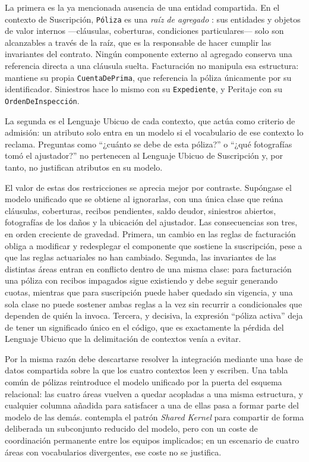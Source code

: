 La primera es la ya mencionada ausencia de una entidad compartida. En el contexto de Suscripción,
\texttt{Póliza} es una \emph{raíz de agregado} \parencite{evans2003}: sus entidades y objetos de
valor internos ---cláusulas, coberturas, condiciones particulares--- solo son alcanzables a través
de la raíz, que es la responsable de hacer cumplir las invariantes del contrato. Ningún componente
externo al agregado conserva una referencia directa a una cláusula suelta. Facturación no manipula
esa estructura: mantiene su propia \texttt{CuentaDePrima}, que referencia la póliza únicamente por
su identificador. Siniestros hace lo mismo con su \texttt{Expediente}, y Peritaje con su
\texttt{OrdenDeInspección}.

La segunda es el Lenguaje Ubicuo de cada contexto, que actúa como criterio de admisión: un atributo
solo entra en un modelo si el vocabulario de ese contexto lo reclama. Preguntas como
\enquote{¿cuánto se debe de esta póliza?} o \enquote{¿qué fotografías tomó el ajustador?} no
pertenecen al Lenguaje Ubicuo de Suscripción y, por tanto, no justifican atributos en su modelo.

El valor de estas dos restricciones se aprecia mejor por contraste. Supóngase el modelo unificado que
se obtiene al ignorarlas, con una única clase que reúna cláusulas, coberturas, recibos pendientes,
saldo deudor, siniestros abiertos, fotografías de los daños y la ubicación del ajustador. Las
consecuencias son tres, en orden creciente de gravedad. Primera, un cambio en las reglas de
facturación obliga a modificar y redesplegar el componente que sostiene la suscripción, pese a que
las reglas actuariales no han cambiado. Segunda, las invariantes de las distintas áreas entran en
conflicto dentro de una misma clase: para facturación una póliza con recibos impagados sigue
existiendo y debe seguir generando cuotas, mientras que para suscripción puede haber quedado sin
vigencia, y una sola clase no puede sostener ambas reglas a la vez sin recurrir a condicionales que
dependen de quién la invoca. Tercera, y decisiva, la expresión \enquote{póliza activa} deja de tener
un significado único en el código, que es exactamente la pérdida del Lenguaje Ubicuo que la
delimitación de contextos venía a evitar.

Por la misma razón debe descartarse resolver la integración mediante una base de datos compartida
sobre la que los cuatro contextos leen y escriben. Una tabla común de pólizas reintroduce el modelo
unificado por la puerta del esquema relacional: las cuatro áreas vuelven a quedar acopladas a una
misma estructura, y cualquier columna añadida para satisfacer a una de ellas pasa a formar parte del
modelo de las demás. \textcite{evans2003} contempla el patrón \emph{Shared Kernel} para compartir
de forma deliberada un subconjunto reducido del modelo, pero con un coste de coordinación permanente
entre los equipos implicados; en un escenario de cuatro áreas con vocabularios divergentes, ese
coste no se justifica.

